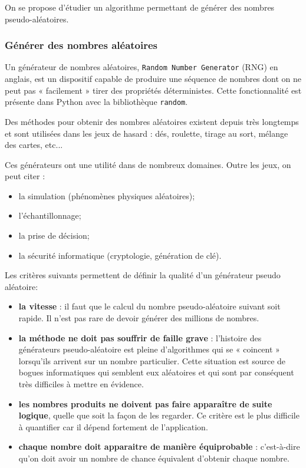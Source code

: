 
On se propose d'étudier un algorithme permettant de générer des nombres pseudo-aléatoires.

\subsubsection*{Générer des nombres aléatoires}
Un générateur de nombres aléatoires, \texttt{Random Number Generator} (RNG) en anglais, est un dispositif capable de produire une séquence de nombres dont on ne peut pas « facilement » tirer des propriétés déterministes. Cette fonctionnalité est présente dans Python avec la bibliothèque \texttt{random}.

Des méthodes pour obtenir des nombres aléatoires existent depuis très longtemps et sont utilisées dans les jeux de hasard : dés, roulette, tirage au sort, mélange des cartes, etc... 

\vspace{0.2cm}
Ces générateurs ont une utilité dans de nombreux domaines. Outre les jeux, on peut citer :
\begin{itemize} 
\item la simulation (phénomènes physiques aléatoires);
\item l'échantillonnage;
\item la prise de décision;
\item la sécurité informatique (cryptologie, génération de clé).
\end{itemize}

\vspace{0.5cm}

Les critères suivants permettent de définir la qualité d'un générateur pseudo aléatoire:
\begin{itemize}
\item    \textbf{la vitesse} : il faut que le calcul du nombre pseudo-aléatoire suivant soit rapide. Il n'est pas rare de devoir générer des millions de nombres.
\item  \textbf{la méthode ne doit pas souffrir de faille grave} : l'histoire des générateurs pseudo-aléatoire est pleine d'algorithmes qui se « coincent » lorsqu'ils arrivent sur un nombre particulier. Cette situation est source de bogues informatiques qui semblent eux aléatoires et qui sont par conséquent très difficiles à mettre en évidence.

\item   \textbf{les nombres produits ne doivent pas faire apparaître de suite logique}, quelle que soit la façon de les regarder. Ce critère est le plus difficile à quantifier car il dépend fortement de l'application.

\item \textbf{chaque nombre doit apparaitre de manière équiprobable} : c'est-à-dire qu'on doit avoir un nombre de chance équivalent d'obtenir chaque nombre.
\end{itemize}

